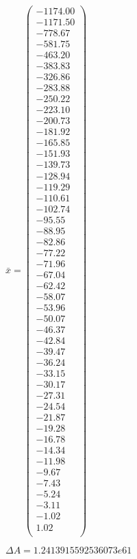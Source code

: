 \documentclass[a4paper,12pt]{article}
\begin{document}
$\bar { x } = \begin{pmatrix}
-1174.00 \\
-1171.50 \\
-778.67 \\
-581.75 \\
-463.20 \\
-383.83 \\
-326.86 \\
-283.88 \\
-250.22 \\
-223.10 \\
-200.73 \\
-181.92 \\
-165.85 \\
-151.93 \\
-139.73 \\
-128.94 \\
-119.29 \\
-110.61 \\
-102.74 \\
-95.55 \\
-88.95 \\
-82.86 \\
-77.22 \\
-71.96 \\
-67.04 \\
-62.42 \\
-58.07 \\
-53.96 \\
-50.07 \\
-46.37 \\
-42.84 \\
-39.47 \\
-36.24 \\
-33.15 \\
-30.17 \\
-27.31 \\
-24.54 \\
-21.87 \\
-19.28 \\
-16.78 \\
-14.34 \\
-11.98 \\
-9.67 \\
-7.43 \\
-5.24 \\
-3.11 \\
-1.02 \\
1.02 \\
\end{pmatrix}
$

$\Delta A = 1.2413915592536073e61$
\end{document}
